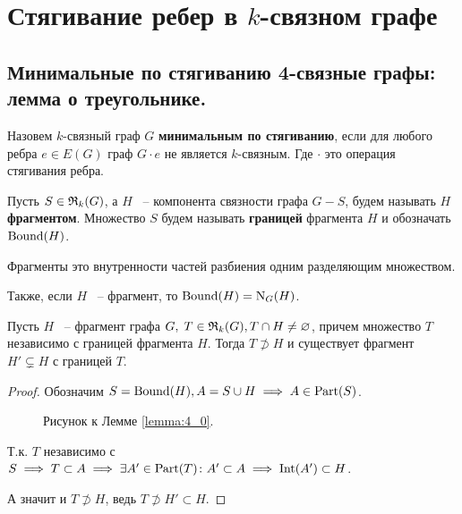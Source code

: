 
\section{Стягивание ребер в $k$-связном графе}

\subsection{Минимальные по стягиванию 4-связные графы: лемма о треугольнике.}

\begin{df*}
	Назовем $k$-связный граф $G$ \textbf{минимальным по стягиванию}, если для любого ребра $e \in E(G)$ граф $G \cdot e$ не является  $k$-связным. Где  $\cdot$ это операция стягивания ребра.
\end{df*}

\begin{df*}
	Пусть $S \in \mathfrak{R}_k(G)$, а $H$ ~-- компонента связности графа $G - S$, будем называть $H$ \textbf{фрагментом}.
	Множество $S$ будем называть \textbf{границей} фрагмента $H$ и обозначать $\operatorname{Bound}(H)$.
\end{df*}

\begin{remrk*}
	Фрагменты это внутренности частей разбиения одним разделяющим множеством.

	Также, если $H$ ~-- фрагмент, то $\operatorname{Bound}(H) = \operatorname{N}_G(H)$.
\end{remrk*}

\begin{customlm}{4.0} \label{lemma:4_0}
	Пусть $H$ ~-- фрагмент графа $G, \; T \in \mathfrak{R}_k(G), T \cap H \neq \varnothing$, причем множество  $T$ независимо с границей фрагмента $H$. Тогда $T \not \supset H$ и существует фрагмент $H' \subsetneq H$ с границей $T$.
\end{customlm}

\begin{proof}
	Обозначим $S = \operatorname{Bound}(H), A = S \cup H \implies A \in \operatorname{Part}(S)$.

\begin{figure}[ht]
    \centering
	\caption{Рисунок к Лемме \ref{lemma:4_0}.}
    \label{fig:lemma_4_0}
\end{figure}

	Т.к. $T$ независимо с  $S \implies T \subset A \implies \exists A' \in \operatorname{Part}(T) \colon A' \subset A \implies \operatorname{Int}(A') \subset H$.

	А значит и $T \not \supset H$, ведь  $T \not \supset H' \subset H$.
\end{proof}

